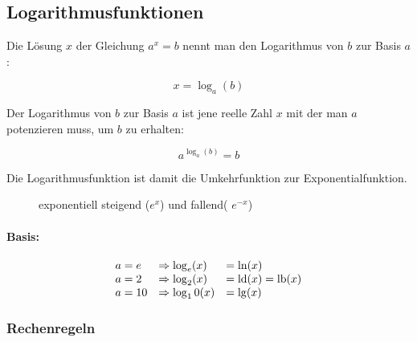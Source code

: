 \subsection{Logarithmusfunktionen}

Die Lösung \( x \) der Gleichung \( a^x = b \) nennt man
den Logarithmus von \( b \) zur Basis \( a \):

\[
    x = \log_a(b)
\]

Der Logarithmus von \( b \) zur Basis \( a \) ist jene reelle
Zahl \( x \) mit der man \( a \) potenzieren muss, um \( b \)
zu erhalten:

\[
    a^{\log_a(b)} = b    
\]

Die Logarithmusfunktion ist damit die Umkehrfunktion zur
Exponentialfunktion.


\begin{figure}[H]
    \centering
    \caption{exponentiell steigend (\( e^x \)) und fallend( \( e^{-x} \))}
\end{figure}


\paragraph{Basis:}
\begin{equation*}
    \begin{array}{lll}
        a = e &\Rightarrow \log_e(x) &= \ln(x) \\
        a = 2 &\Rightarrow \log_2(x) &= \operatorname{ld}(x) = \operatorname{lb}(x) \\
        a = 10 &\Rightarrow \log_10(x) &= \lg(x)
    \end{array}
\end{equation*}

\subsubsection{Rechenregeln}

